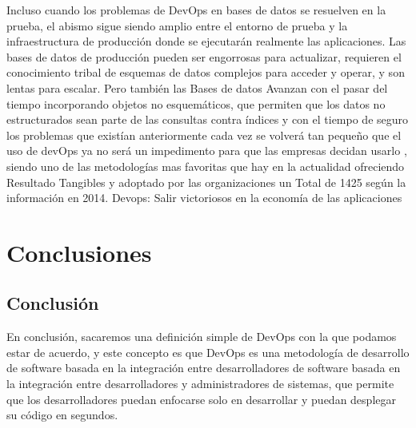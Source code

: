 \documentclass[preprint,12pt]{elsarticle}
\begin{document}
Incluso cuando los problemas de DevOps en bases de datos se resuelven en la prueba, el abismo sigue siendo amplio entre el entorno de prueba y la infraestructura de producción donde se ejecutarán realmente las aplicaciones. Las bases de datos de producción pueden ser engorrosas para actualizar, requieren el conocimiento tribal de esquemas de datos complejos para acceder y operar, y son lentas para escalar. Pero también las Bases de datos Avanzan con el pasar del tiempo incorporando objetos no esquemáticos, que permiten que los datos no estructurados sean parte de las consultas contra índices y con el tiempo de seguro los problemas que existían anteriormente cada vez se volverá tan pequeño que el uso de devOps ya no será un impedimento para que las empresas decidan usarlo , siendo uno de las metodologías mas favoritas que hay en la actualidad ofreciendo Resultado Tangibles y adoptado por las organizaciones un Total de 1425 según la información en 2014. Devops: Salir victoriosos en la economía de las aplicaciones




\section{Conclusiones}
\subsection{Conclusión }	
En conclusión, sacaremos una definición simple de DevOps con la que podamos estar de acuerdo, y este concepto es que DevOps es una metodología de desarrollo de software basada en la integración entre desarrolladores de software basada en la integración entre desarrolladores y administradores de sistemas, que permite que los desarrolladores puedan enfocarse solo en desarrollar y puedan desplegar su código en segundos.


	
	

	
	\newpage
	
		 
\citep{referenciarobles2}  
\citep{referenciarobles1}   
	
\end{document}
